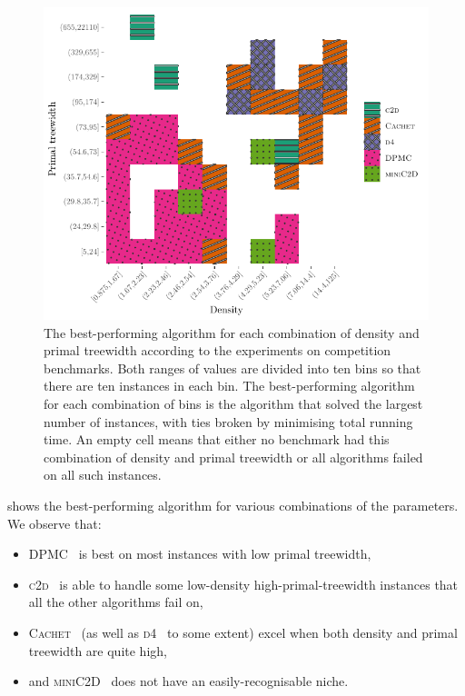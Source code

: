 \documentclass[runningheads]{llncs}
\begin{document}
\begin{figure}[t]
  \centering
  \includegraphics{real.pdf}
  \caption{The best-performing algorithm for each combination of density and
    primal treewidth according to the experiments on competition benchmarks.
    Both ranges of values are divided into ten bins so that there are ten
    instances in each bin. The best-performing algorithm for each combination of
    bins is the algorithm that solved the largest number of instances, with ties
    broken by minimising total running time. An empty cell means that either no
    benchmark had this combination of density and primal treewidth or all
    algorithms failed on all such instances.}\label{fig:real}
\end{figure}

 shows the best-performing algorithm for various combinations of
the parameters. We observe that:
\begin{itemize}
  \item \textsc{DPMC}~\cite{DBLP:conf/cp/DudekPV20} is best on most instances
        with low primal treewidth,
  \item \textsc{c2d}~\cite{DBLP:conf/ecai/Darwiche04} is able to handle some
        low-density high-primal-treewidth instances that all the other
        algorithms fail on,
  \item \textsc{Cachet}~\cite{DBLP:conf/sat/SangBBKP04} (as well as
        \textsc{d4}~\cite{DBLP:conf/ijcai/LagniezM17} to some extent) excel when
        both density and primal treewidth are quite high,
  \item and \textsc{miniC2D}~\cite{DBLP:conf/ijcai/OztokD15} does not have an
        easily-recognisable niche.
\end{itemize}
\end{document}
